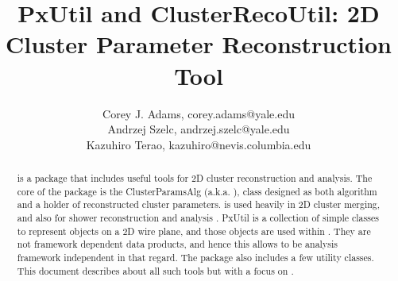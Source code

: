 \documentclass[a4paper,12pt]{report}
\begin{document}
\title{PxUtil and ClusterRecoUtil: 2D Cluster Parameter Reconstruction Tool}
\author{
  Corey J. Adams, corey.adams@yale.edu

  Andrzej Szelc, andrzej.szelc@yale.edu

  Kazuhiro Terao, kazuhiro@nevis.columbia.edu
}
\maketitle

\begin{abstract}
{\cru} is a package that includes useful tools for 2D cluster reconstruction and analysis.  The core of the package is the {\ttfamily ClusterParamsAlg} (a.k.a. {\cpan}), {\CPP} class designed as both algorithm and a holder of reconstructed cluster parameters. {\cpan} is used heavily in 2D cluster merging, and also for shower reconstruction and analysis \cite{CMTool,CMAlgo}. {\ttfamily PxUtil} is a collection of simple classes to represent objects on a 2D wire plane, and those objects are used within {\cpan}. They are not framework dependent data products, and hence this allows {\cpan} to be analysis framework independent in that regard. The package also includes a few utility classes. This document describes about all such tools but with a focus on {\cpan}.
\end{abstract}

\tableofcontents

\newpage
\end{document}
